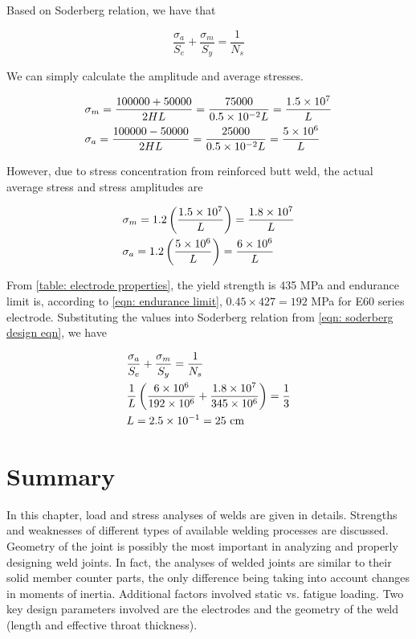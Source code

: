 \documentclass[
10pt,
a4paper,
openany,
svgnames,
]{book}
\begin{document}
\begin{solution}
  Based on Soderberg relation, we have that

  \[\frac{\sigma _a}{S_e} + \frac{\sigma _m}{S_y} = \frac{1}{N_s}\]

  We can simply calculate the amplitude and average stresses.

  \[\begin{gathered}
      \sigma_m = \frac{100000 + 50000}{2HL} = \frac{75000}{0.5 \times 10^{-2}L} = \frac{1.5 \times 10^7}{L} \hfill \\
      \sigma_a = \frac{100000 - 50000}{2HL} = \frac{25000}{0.5 \times 10^{-2}L} = \frac{5 \times 10^6}{L} \hfill \\ 
    \end{gathered} \]

  However, due to stress concentration from reinforced butt weld, the actual average stress and stress amplitudes are

  \[\begin{gathered}
      \sigma_m = 1.2\left( \frac{1.5 \times 10^7}{L} \right) = \frac{1.8 \times 10^7}{L} \hfill \\
      \sigma_a = 1.2\left( \frac{5 \times 10^6}{L} \right) = \frac{6 \times 10^6}{L} \hfill \\ 
    \end{gathered} \]

  From \cref{table: electrode properties}, the yield strength is 435 MPa and endurance limit is, according to \cref{eqn: endurance limit}, $0.45 \times 427 = 192$ MPa for E60 series electrode. Substituting the values into Soderberg relation from \cref{eqn: soderberg design eqn}, we have

  \[\begin{gathered}
      \frac{\sigma_a}{S_e} + \frac{\sigma_m}{S_y} = \frac{1}{N_s} \hfill \\
      {1 \over L} \left( \frac{6 \times 10^6}{192 \times 10^6} + \frac{1.8 \times 10^7}{345 \times 10^6} \right) = \frac{1}{3} \hfill \\
      L = 2.5 \times {10^{-1}} = 25\text{ cm} \hfill \\ 
    \end{gathered} \]
\end{solution}

\section*{Summary}

In this chapter, load and stress analyses of welds are given in details. Strengths and weaknesses of different types of available welding processes are discussed. Geometry of the joint is possibly the most important in analyzing and properly designing weld joints. In fact, the analyses of welded joints are similar to their solid member counter parts, the only difference being taking into account changes in moments of inertia. Additional factors involved static vs. fatigue loading. Two key design parameters involved are the electrodes and the geometry of the weld (length and effective throat thickness).
\end{document}
